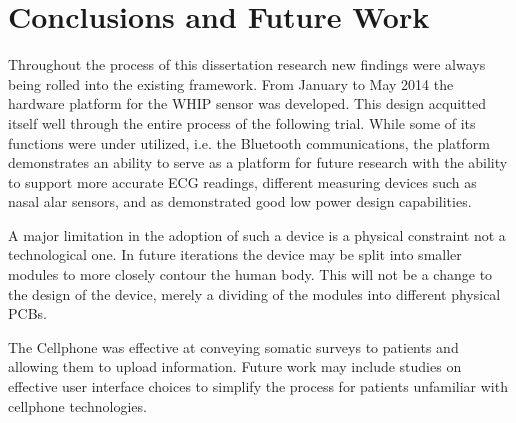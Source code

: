 \chapter{Conclusions and Future Work}

Throughout the process of this dissertation research new findings were always being rolled into the existing framework. From January to May 2014 the hardware platform for the WHIP sensor was developed. This design acquitted itself well through the entire process of the following trial. While some of its functions were under utilized, i.e. the Bluetooth communications, the platform demonstrates an ability to serve as a platform for future research with the ability to support more accurate ECG readings, different  measuring devices such as nasal alar sensors, and as demonstrated good low power design capabilities. 

A major limitation in the adoption of such a device is a physical constraint not a technological one. In future iterations the device may be split into smaller modules to more closely contour the human body. This will not be a change to the design of the device, merely a dividing of the modules into different physical PCBs.

The Cellphone was effective at conveying somatic surveys to patients and allowing them to upload information. Future work may include studies on effective user interface choices to simplify the process for patients unfamiliar with cellphone technologies.
